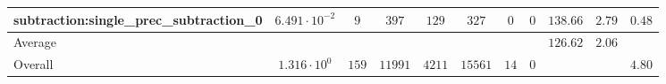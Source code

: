 \begin{tabular}{|l|c|c|c|c|c|c|c|c|c|c|}
subtraction:single\_prec\_subtraction\_0         & $ 6.491 \cdot 10^{-2} $ & $ 9      $ & $ 397   $ & $ 129  $ & $ 327   $ & $ 0  $ & $ 0 $ & $ 138.66      $ & $ 2.79    $ & $ 0.48    $ \\
\hline
Average                                          & $                     $ & $        $ & $       $ & $      $ & $       $ & $    $ & $   $ & $ 126.62      $ & $ 2.06    $ & $         $ \\
\hline
Overall                                          & $ 1.316 \cdot 10^{0}  $ & $ 159    $ & $ 11991 $ & $ 4211 $ & $ 15561 $ & $ 14 $ & $ 0 $ & $             $ & $         $ & $ 4.80    $ \\
\hline
\end{tabular}
